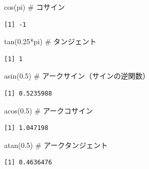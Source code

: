 \documentclass[
  letterpaper,
  DIV=11,
  numbers=noendperiod]{scrreprt}
\newenvironment{Shaded}{\begin{snugshade}}{\end{snugshade}}
\newcommand{\CommentTok}[1]{\textcolor[rgb]{0.37,0.37,0.37}{#1}}
\newcommand{\FloatTok}[1]{\textcolor[rgb]{0.68,0.00,0.00}{#1}}
\newcommand{\FunctionTok}[1]{\textcolor[rgb]{0.28,0.35,0.67}{#1}}
\newcommand{\NormalTok}[1]{\textcolor[rgb]{0.00,0.23,0.31}{#1}}
\newcommand{\SpecialCharTok}[1]{\textcolor[rgb]{0.37,0.37,0.37}{#1}}
\begin{document}
\begin{Shaded}
\begin{Highlighting}[]
\FunctionTok{cos}\NormalTok{(pi) }\CommentTok{\# コサイン}
\end{Highlighting}
\end{Shaded}

\begin{verbatim}
[1] -1
\end{verbatim}

\begin{Shaded}
\begin{Highlighting}[]
\FunctionTok{tan}\NormalTok{(}\FloatTok{0.25}\SpecialCharTok{*}\NormalTok{pi) }\CommentTok{\# タンジェント}
\end{Highlighting}
\end{Shaded}

\begin{verbatim}
[1] 1
\end{verbatim}

\begin{Shaded}
\begin{Highlighting}[]
\FunctionTok{asin}\NormalTok{(}\FloatTok{0.5}\NormalTok{) }\CommentTok{\# アークサイン（サインの逆関数）}
\end{Highlighting}
\end{Shaded}

\begin{verbatim}
[1] 0.5235988
\end{verbatim}

\begin{Shaded}
\begin{Highlighting}[]
\FunctionTok{acos}\NormalTok{(}\FloatTok{0.5}\NormalTok{) }\CommentTok{\# アークコサイン}
\end{Highlighting}
\end{Shaded}

\begin{verbatim}
[1] 1.047198
\end{verbatim}

\begin{Shaded}
\begin{Highlighting}[]
\FunctionTok{atan}\NormalTok{(}\FloatTok{0.5}\NormalTok{) }\CommentTok{\# アークタンジェント}
\end{Highlighting}
\end{Shaded}

\begin{verbatim}
[1] 0.4636476
\end{verbatim}
\end{document}
